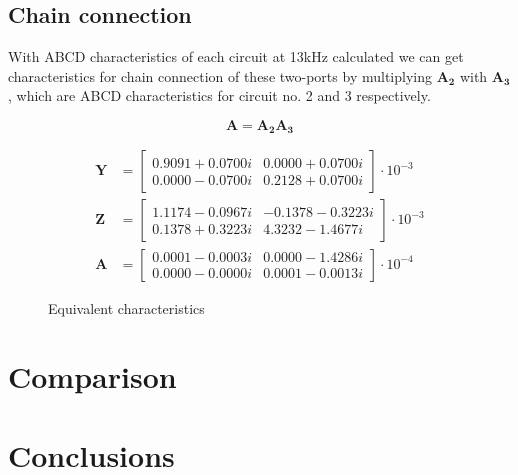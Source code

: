 \documentclass[notitlepage, a4paper, 11pt]{article}
\begin{document}
	\subsection{Chain connection}
	With ABCD characteristics of each circuit at 13kHz calculated we can get characteristics for chain connection of these two-ports by multiplying $\mathbf{A_2}$ with $\mathbf{A_3}$, which are ABCD characteristics for circuit no. 2 and 3 respectively.
	
	\begin{equation}
		\mathbf{A} = \mathbf{A_2} \mathbf{A_3}
	\end{equation}
	
		\begin{figure}[H]
		\begin{align*}
			\mathbf{Y} &= 
			\begin{bmatrix}
				0.9091 + 0.0700i  & 0.0000 + 0.0700i \\
				0.0000 - 0.0700i  & 0.2128 + 0.0700i
			\end{bmatrix}
			\cdot 10^{-3}
			\\
			\mathbf{Z} &= 
			\begin{bmatrix}
				1.1174 - 0.0967i & -0.1378 - 0.3223i \\
				0.1378 + 0.3223i & 4.3232 - 1.4677i
			\end{bmatrix}
			\cdot 10^{-3}
			\\
			\mathbf{A} &= 
			\begin{bmatrix}
				0.0001 - 0.0003i & 0.0000 - 1.4286i \\
				0.0000 - 0.0000i & 0.0001 - 0.0013i
			\end{bmatrix}
			\cdot 10^{-4}
		\end{align*}
		\caption{Equivalent characteristics}
		\end{figure}
	
	\section{Comparison}
	\section{Conclusions}
	
	
	
\end{document}

